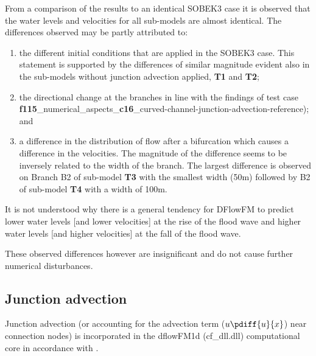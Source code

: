 From a comparison of the results to an identical SOBEK3 case it is observed that the water levels and velocities for all sub-models are almost identical. The differences observed may be partly attributed to:
\begin{enumerate}
 \item the different initial conditions that are applied in the SOBEK3 case. This statement is supported by the differences of similar magnitude evident also in the sub-models without junction advection applied,  \textbf{\textcolor[rgb]{1,0,0}{T1}} and \textbf{\textcolor[rgb]{1,0,0}{T2}};
 \item the directional change at the branches in line with the findings of test case \textbf{f115}\_numerical\_aspects\_\textbf{c16}\_curved-channel-junction-advection-reference); and
 \item a difference in the distribution of flow after a bifurcation which causes a difference in the velocities. The magnitude of the difference seems to be inversely related to the width of the branch. The largest difference is observed on Branch B2 of sub-model  \textbf{\textcolor[rgb]{1,0,0}{T3}} with the smallest width (50m) followed by B2 of sub-model  \textbf{\textcolor[rgb]{1,0,0}{T4}} with a width of 100m.
\end{enumerate}

It is not understood why there is a general tendency for DFlowFM to predict lower water levels [and lower velocities] at the rise of the flood wave and higher water levels [and higher velocities] at the fall of the flood wave.

These observed differences however are insignificant and do not cause further numerical disturbances. 


\subsection{Junction advection} \label{10407:description of junction advection}
Junction advection (or accounting for the advection term ($u \pdiff{u}{x}$) near connection nodes) is incorporated in the dflowFM1d (cf\_dll.dll) computational core in accordance with \citet{Borsboom2017}.

